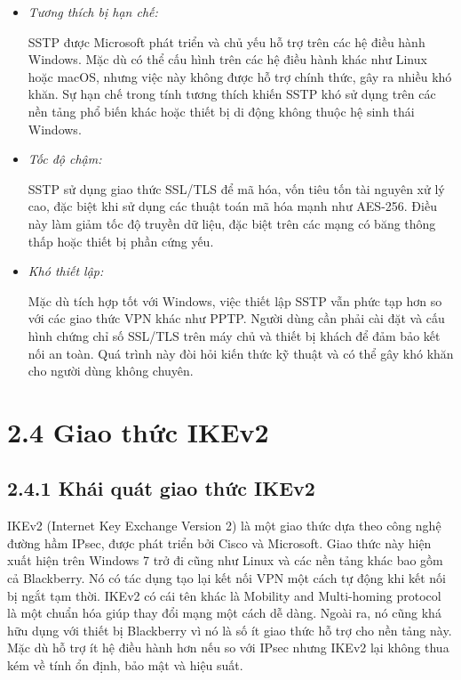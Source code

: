  \begin{itemize}
        \item \textit{Tương thích bị hạn chế:}
        
         SSTP được Microsoft phát triển và chủ yếu hỗ trợ trên các hệ điều hành Windows. Mặc dù có thể cấu hình trên các hệ điều hành khác như Linux hoặc macOS, nhưng việc này không được hỗ trợ chính thức, gây ra nhiều khó khăn. Sự hạn chế trong tính tương thích khiến SSTP khó sử dụng trên các nền tảng phổ biến khác hoặc thiết bị di động không thuộc hệ sinh thái Windows.
        \item \textit{Tốc độ chậm:}

        SSTP sử dụng giao thức SSL/TLS để mã hóa, vốn tiêu tốn tài nguyên xử lý cao, đặc biệt khi sử dụng các thuật toán mã hóa mạnh như AES-256. Điều này làm giảm tốc độ truyền dữ liệu, đặc biệt trên các mạng có băng thông thấp hoặc thiết bị phần cứng yếu. 

        \item \textit{Khó thiết lập:}

        Mặc dù tích hợp tốt với Windows, việc thiết lập SSTP vẫn phức tạp hơn so với các giao thức VPN khác như PPTP. Người dùng cần phải cài đặt và cấu hình chứng chỉ số SSL/TLS trên máy chủ và thiết bị khách để đảm bảo kết nối an toàn. Quá trình này đòi hỏi kiến thức kỹ thuật và có thể gây khó khăn cho người dùng không chuyên.
    \end{itemize} 

    
 \section*{2.4 Giao thức IKEv2 }

 \subsection*{2.4.1 Khái quát giao thức IKEv2}

  IKEv2 (Internet Key Exchange Version 2) là một giao thức dựa theo công nghệ đường hầm IPsec, được phát triển bởi Cisco và Microsoft. Giao thức này hiện xuất hiện trên Windows 7 trở đi cũng như Linux và các nền tảng khác bao gồm cả  Blackberry. Nó có tác dụng tạo lại kết nối VPN một cách tự động khi kết nối bị ngắt tạm thời. IKEv2 có cái tên khác là Mobility and Multi-homing protocol là một chuẩn hóa giúp thay đổi mạng một cách dễ dàng. Ngoài ra, nó cũng khá hữu dụng với thiết bị Blackberry vì nó là số ít giao thức hỗ trợ cho nền tảng này.  Mặc dù hỗ trợ ít hệ điều hành hơn nếu so với  IPsec nhưng IKEv2 lại không thua kém về tính ổn định, bảo mật và hiệu suất.
 
